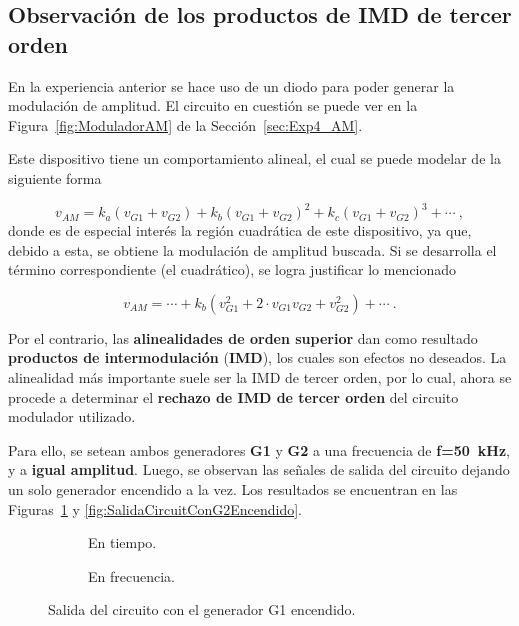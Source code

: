   \subsection{Observación de los productos de IMD de tercer orden}
    En la experiencia anterior se hace uso de un diodo para poder generar la modulación de
    amplitud. El circuito en cuestión se puede ver en la Figura~\ref{fig:ModuladorAM} de
    la Sección~\ref{sec:Exp4_AM}.

    Este dispositivo tiene un comportamiento alineal, el cual se puede modelar
    de la siguiente  forma

    \vspace{-10pt}
    \begin{equation*}
      v_{AM} = k_a(v_{G1}+v_{G2}) + k_b(v_{G1}+v_{G2})^2 + k_c(v_{G1}+v_{G2})^3 + \cdots~,
    \end{equation*}
    donde es de especial interés la región cuadrática de este dispositivo, ya que,
    debido a esta, se obtiene la modulación de amplitud buscada. Si se 
    desarrolla el término correspondiente (el cuadrático), se logra justificar lo
    mencionado
    
    \vspace{-10pt}
    \begin{equation*}
      v_{AM} = \cdots + k_b(v_{G1}^2 + 2\cdot{v_{G1}v_{G2}} + v_{G2}^2) + \cdots ~.
    \end{equation*}

    Por el contrario, las \textbf{alinealidades de orden superior} dan como resultado \textbf{productos
    de intermodulación} (\textbf{IMD}), los cuales son efectos no deseados. La alinealidad más
    importante suele ser la IMD de tercer orden, por lo cual, ahora se procede a determinar el
    \textbf{rechazo de IMD de tercer orden} del circuito modulador utilizado.

    Para ello, se setean ambos generadores \textbf{G1} y \textbf{G2} a una frecuencia de 
    \textbf{f=50~kHz}, y a \textbf{igual amplitud}. Luego, se observan las señales de salida del circuito 
    dejando un solo generador encendido a la vez. Los resultados se encuentran en las 
    Figuras~\ref{fig:SalidaCircuitConG1Encendido} y \ref{fig:SalidaCircuitConG2Encendido}.


    \begin{figure}[H]
      \centering
      \begin{subfigure}[H]{0.44\textwidth}
        \caption{En tiempo.}
      \end{subfigure}
      \hfill 
      \begin{subfigure}[H]{0.44\textwidth}
        \caption{En frecuencia.}
      \end{subfigure}

      \caption{Salida del circuito con el generador G1 encendido.}
      \label{fig:SalidaCircuitConG1Encendido}
    \end{figure}


